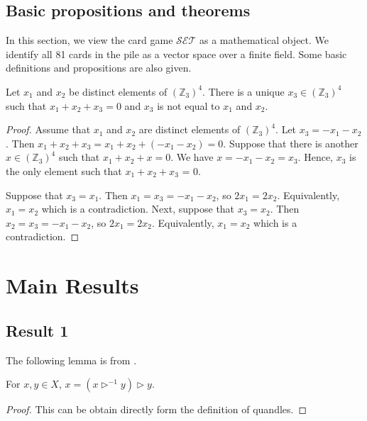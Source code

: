 \documentclass[ma493]{swumath}
\begin{document}
\section{Basic propositions and theorems}
In this section, we view the card game $\mathcal{SET}$ as a mathematical object. We identify all 81 cards in the pile as a vector space over a finite field. Some basic definitions and propositions are also given.

\begin{proposition} Let $x_1$ and $x_2$ be distinct elements of $(\mathbb{Z}_3)^4$. There is a unique $x_3 \in (\mathbb{Z}_3)^4$ such that $x_1+ x_2+ x_3 = 0$ and $x_3$ is not equal to $x_1$ and $x_2$.
\end{proposition}
\begin{proof} Assume that $x_1$ and $x_2$ are distinct elements of $(\mathbb{Z}_3)^4$. Let $x_3 = -x_1-x_2$. Then $x_1+ x_2+ x_3 = x_1+ x_2+ (-x_1-x_2) = 0.$ Suppose that there is another $x \in (\mathbb{Z}_3)^4$ such that $x_1+ x_2+ x = 0$. We have $x = -x_1-x_2 = x_3$. Hence, $x_3$ is the only element such that $x_1+ x_2+ x_3$ = 0.

Suppose that $x_3 = x_1$. Then $x_1 = x_3 = -x_1-x_2$, so $2x_1 = 2x_2$. Equivalently, $x_1 = x_2$ which is a contradiction. Next, suppose that $x_3 = x_2$. Then $x_2  = x_3 =-x_1-x_2$, so $2x_1= 2x_2$. Equivalently, $x_1 = x_2$ which is a contradiction. 
 \end{proof}

\chapter{Main Results}

\section{Result 1}
The following lemma is from \cite{davis}.
\begin{lemma}
	For $x, y \in X$, $x=(x \vartriangleright^{-1} y)\vartriangleright y$.
\end{lemma}
\begin{proof}
	This can be obtain directly form the definition of quandles.
\end{proof}
\end{document}
